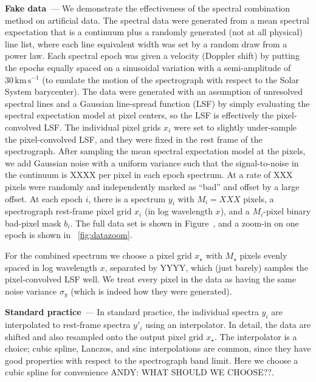 \documentclass[11pt]{article}
\renewcommand{\paragraph}[1]{\medskip\par\noindent\textbf{#1}~---}
\newcommand{\unit}[1]{\mathrm{#1}}
\newcommand{\kmps}{\unit{km\,s^{-1}}}
\begin{document}
\paragraph{Fake data}
We demonstrate the effectiveness of the spectral combination method on artificial data.
The spectral data were generated from a mean spectral expectation that is a continuum plus a randomly generated (not at all physical) line list, where each line equivalent width was set by a random draw from a power law.
Each spectral epoch was given a velocity (Doppler shift) by putting the epochs equally spaced on a sinusoidal variation with a semi-amplitude of $30\,\kmps$ (to emulate the motion of the spectrograph with respect to the Solar System barycenter).
The data were generated with an assumption of unresolved spectral lines and a Gaussian line-spread function (LSF) by simply evaluating the spectral expectation model at pixel centers, so the LSF is effectively the pixel-convolved LSF.
The individual pixel grids $x_i$ were set to slightly under-sample the pixel-convolved LSF, and they were fixed in the rest frame of the spectrograph.
After sampling the mean spectral expectation model at the pixels, we add Gaussian noise with a uniform variance such that the signal-to-noise in the continuum is XXXX per pixel in each epoch spectrum.
At a rate of XXX pixels were randomly and independently marked as ``bad'' and offset by a large offset.
At each epoch $i$, there is a spectrum $y_i$ with $M_i=XXX$ pixels, a spectrograph rest-frame pixel grid $x_i$ (in log wavelength $x$), and a $M_i$-pixel binary bad-pixel mask $b_i$.
The full data set is shown in Figure~\label{fig:data}, and a zoom-in on one epoch is shown in \figurename~\ref{fig:datazoom}.

For the combined spectrum we choose a pixel grid $x_\star$ with $M_\star$ pixels evenly spaced in log wavelength $x$, separated by YYYY, which (just barely) samples the pixel-convolved LSF well.
We treat every pixel in the data as having the same noise variance $\sigma_y$ (which is indeed how they were generated).

\paragraph{Standard practice}
In standard practice, the individual spectra $y_i$ are interpolated to rest-frame spectra $y'_i$ using an interpolator.
In detail, the data are shifted and also resampled onto the output pixel grid $x_\star$.
The interpolator is a choice; cubic spline, Lanczos, and sinc interpolations are common, since they have good properties with respect to the spectrograph band limit.
Here we choose a cubic spline for convenience ANDY: WHAT SHOULD WE CHOOSE??.
\end{document}
